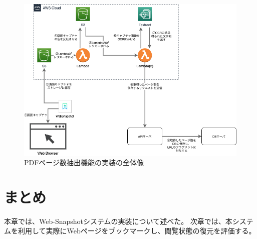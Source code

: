 \begin{figure}[htbp]
  \label{fig:impl-pdf-overall}
  \begin{center}
    \includegraphics[bb=0 0 734 522,width=15cm]{img/050_implementation/server/impl-pdf-overall.pdf}
  \end{center}
  \caption{PDFページ数抽出機能の実装の全体像}
\end{figure}

\section{まとめ}
本章では、Web-Snapshotシステムの実装について述べた。
次章では、本システムを利用して実際にWebページをブックマークし、閲覧状態の復元を評価する。